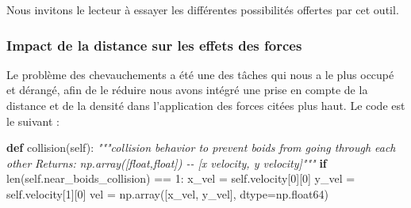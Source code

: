 \documentclass[
]{article}
\newenvironment{Shaded}{}{}
\newcommand{\BuiltInTok}[1]{#1}
\newcommand{\CommentTok}[1]{\textcolor[rgb]{0.38,0.63,0.69}{\textit{#1}}}
\newcommand{\ControlFlowTok}[1]{\textcolor[rgb]{0.00,0.44,0.13}{\textbf{#1}}}
\newcommand{\DecValTok}[1]{\textcolor[rgb]{0.25,0.63,0.44}{#1}}
\newcommand{\KeywordTok}[1]{\textcolor[rgb]{0.00,0.44,0.13}{\textbf{#1}}}
\newcommand{\NormalTok}[1]{#1}
\newcommand{\OperatorTok}[1]{\textcolor[rgb]{0.40,0.40,0.40}{#1}}
\newcommand{\VariableTok}[1]{\textcolor[rgb]{0.10,0.09,0.49}{#1}}
\begin{document}
Nous invitons le lecteur à essayer les différentes possibilités offertes
par cet outil.

\hypertarget{impact-de-la-distance-sur-les-effets-des-forces}{%
\subsubsection{Impact de la distance sur les effets des
forces}\label{impact-de-la-distance-sur-les-effets-des-forces}}

Le problème des chevauchements a été une des tâches qui nous a le plus
occupé et dérangé, afin de le réduire nous avons intégré une prise en
compte de la distance et de la densité dans l'application des forces
citées plus haut. Le code est le suivant :

\begin{Shaded}
\begin{Highlighting}[]
\KeywordTok{def}\NormalTok{ collision(}\VariableTok{self}\NormalTok{):}
    \CommentTok{"""collision behavior to prevent boids from going through each other}
\CommentTok{    Returns:}
\CommentTok{        np.array([float,float]) {-}{-} [x velocity, y velocity]"""}
    \ControlFlowTok{if} \BuiltInTok{len}\NormalTok{(}\VariableTok{self}\NormalTok{.near\_boids\_collision) }\OperatorTok{==} \DecValTok{1}\NormalTok{:}
\NormalTok{        x\_vel }\OperatorTok{=} \VariableTok{self}\NormalTok{.velocity[}\DecValTok{0}\NormalTok{][}\DecValTok{0}\NormalTok{]}
\NormalTok{        y\_vel }\OperatorTok{=} \VariableTok{self}\NormalTok{.velocity[}\DecValTok{1}\NormalTok{][}\DecValTok{0}\NormalTok{]}
\NormalTok{        vel }\OperatorTok{=}\NormalTok{ np.array([x\_vel, y\_vel], dtype}\OperatorTok{=}\NormalTok{np.float64)}


\end{Highlighting}
\end{Shaded}
\end{document}
